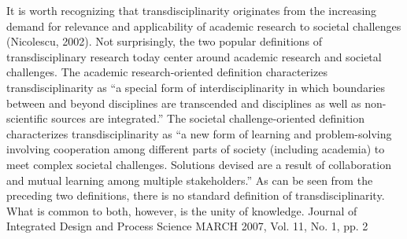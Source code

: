It is worth recognizing that transdisciplinarity originates from the increasing demand for relevance and applicability of academic research to societal challenges (Nicolescu, 2002). Not surprisingly, the two popular definitions of transdisciplinary research today center around academic research and societal challenges. The academic research-oriented definition characterizes transdisciplinarity as ``a special form of interdisciplinarity in which boundaries between and beyond disciplines are transcended and disciplines as well as non-scientific sources are integrated.'' The societal challenge-oriented definition characterizes transdisciplinarity as ``a new form of learning and problem-solving involving cooperation among different parts of society (including academia) to meet complex societal challenges. Solutions devised are a result of collaboration and mutual learning among multiple stakeholders.'' As can be seen from the preceding two definitions, there is no standard definition of transdisciplinarity. What is common to both, however, is the unity of knowledge. Journal of Integrated Design and Process Science MARCH 2007, Vol. 11, No. 1, pp. 2

